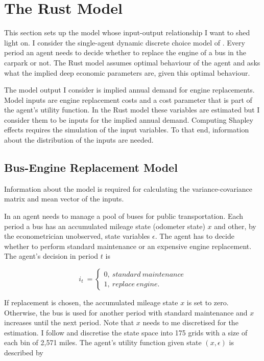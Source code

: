 \section{The Rust Model} \label{rust_model}

This section sets up the model whose input-output relationship I want to shed light on. I consider the single-agent dynamic discrete choice model of \cite{R87}. Every period an agent needs to decide whether to replace the engine of a bus in the carpark or not. The Rust model assumes optimal behaviour of the agent and asks what the implied deep economic parameters are, given this optimal behaviour.

The model output I consider is implied annual demand for engine replacements. Model inputs are engine replacement costs and a cost parameter that is part of the agent’s utility function. In the Rust model these variables are estimated but I consider them to be inputs for the implied annual demand. Computing Shapley effects requires the simulation of the input variables. To that end, information about the distribution of the inputs are needed.

\subsection{Bus-Engine Replacement Model}

Information about the model is required for calculating the variance-covariance matrix and mean vector of the inputs.

In \cite{R87}an agent needs to manage a pool of buses for public transportation. Each period a bus has an accumulated mileage state (odometer state) $x$ and other, by the econometrician unobserved, state variables $\epsilon$. The agent has to decide whether to perform standard maintenance or an expensive engine replacement. The agent’s decision in period $t$ is

\begin{equation}
i_t\ =
\begin{cases}
0,\ standard\ maintenance \\
1,\ replace\ engine.
\end{cases}
\end{equation}


If replacement is chosen, the accumulated mileage state $x$ is set to zero. Otherwise, the bus is used for another period with standard maintenance and $x$ increases until the next period. Note that $x$ needs to me discretised for the estimation. I follow \cite{R87} and discretise the state space into 175 grids with a size of each bin of 2,571 miles.
The agent’s utility function given state $(x, \epsilon)$ is described by


